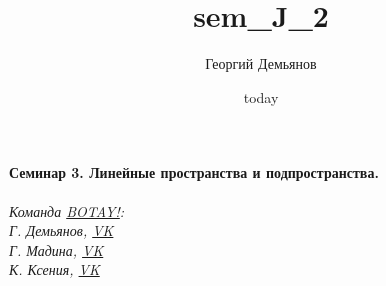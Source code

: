 \documentclass[a4paper,12pt]{article}
\title{sem_J_2}
\author{Георгий Демьянов}
\date{today}
\begin{document}
\paragraph{Семинар 3. Линейные пространства и подпространства.}



\begin{center}
	\vfill \emph{{\small Команда \href{https://vk.com/botay_fizteh}{BOTAY!}:\\
	Г. Демьянов, \href{https://vk.com/id37346992}{VK}\\
	Г. Мадина, \href{https://vk.com/id226312463}{VK}\\
	К. Ксения, \href{https://vk.com/id143862366}{VK}
}}
\end{center}
\end{document}
